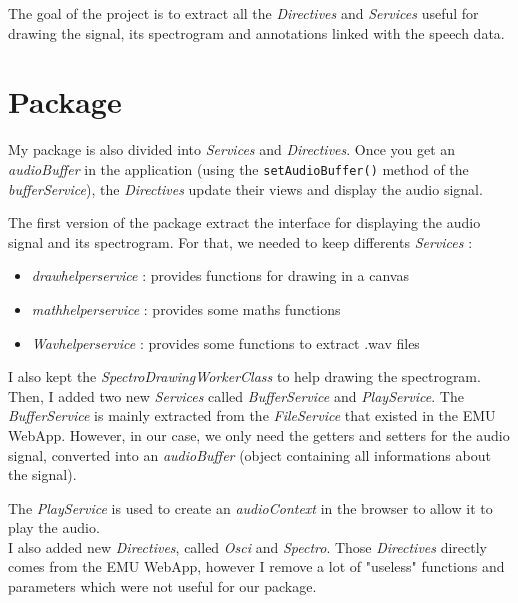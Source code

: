 \documentclass{article}
\begin{document}
The goal of the project is to extract all the \textit{Directives} and \textit{Services} useful for drawing the signal, its spectrogram and annotations linked with the speech data. 


\section{Package}

My package is also divided into \textit{Services} and \textit{Directives}. Once you get an \textit{audioBuffer} in the application (using the \texttt{setAudioBuffer()} method of the \textit{bufferService}), the \textit{Directives} update their views and display the audio signal.

The first version of the package extract the interface for displaying the audio signal and its spectrogram. For that, we needed to keep differents \textit{Services} :
\begin{itemize}
\item \textit{drawhelperservice} : provides functions for drawing in a canvas
\item \textit{mathhelperservice} : provides some maths functions
\item \textit{Wavhelperservice} : provides some functions to extract .wav files
\end{itemize}

I also kept the \textit{SpectroDrawingWorkerClass} to help drawing the spectrogram.\\

Then, I added two new \textit{Services} called \textit{BufferService} and \textit{PlayService}. The \textit{BufferService} is mainly extracted from the \textit{FileService} that existed in the EMU WebApp. However, in our case, we only need the getters and setters for the audio signal, converted into an \textit{audioBuffer} (object containing all informations about the signal). 

The \textit{PlayService} is used to create an \textit{audioContext} in the browser to allow it to play the audio.\\

I also added new \textit{Directives}, called \textit{Osci} and \textit{Spectro}. Those \textit{Directives} directly comes from the EMU WebApp, however I remove a lot of "useless" functions and parameters which were not useful for our package. 
\end{document}

